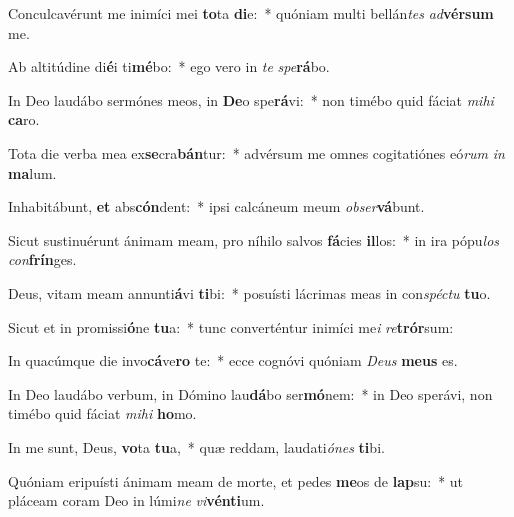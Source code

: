 \item Conculcavérunt me inimíci mei \textbf{to}ta \textbf{di}e:~* quóniam multi bellán\textit{tes} \textit{ad}\textbf{vér}\textbf{sum} me.
\item Ab altitúdine di\textbf{é}i ti\textbf{mé}bo:~* ego vero in \textit{te} \textit{spe}\textbf{rá}bo.
\item In Deo laudábo sermónes meos, in \textbf{De}o spe\textbf{rá}vi:~* non timébo quid fáciat \textit{mi}\textit{hi} \textbf{ca}ro.
\item Tota die verba mea ex\textbf{se}cra\textbf{bán}tur:~* advérsum me omnes cogitatiónes eó\textit{rum} \textit{in} \textbf{ma}lum.
\item Inhabitábunt, \textbf{et} abs\textbf{cón}dent:~* ipsi calcáneum meum \textit{ob}\textit{ser}\textbf{vá}bunt.
\item Sicut sustinuérunt ánimam meam, pro níhilo salvos \textbf{fá}cies \textbf{il}los:~* in ira pópu\textit{los} \textit{con}\textbf{frín}ges.
\item Deus, vitam meam annunti\textbf{á}vi \textbf{ti}bi:~* posuísti lácrimas meas in con\textit{spéc}\textit{tu} \textbf{tu}o.
\item Sicut et in promissi\textbf{ó}ne \textbf{tu}a:~* tunc converténtur inimíci me\textit{i} \textit{re}\textbf{trór}sum:
\item In quacúmque die invo\textbf{cá}ve\textbf{ro} te:~* ecce cognóvi quóniam \textit{De}\textit{us} \textbf{me}\textbf{us} es.
\item In Deo laudábo verbum, in Dómino lau\textbf{dá}bo ser\textbf{mó}nem:~* in Deo sperávi, non timébo quid fáciat \textit{mi}\textit{hi} \textbf{ho}mo.
\item In me sunt, Deus, \textbf{vo}ta \textbf{tu}a,~* quæ reddam, laudati\textit{ó}\textit{nes} \textbf{ti}bi.
\item Quóniam eripuísti ánimam meam de morte, et pedes \textbf{me}os de \textbf{lap}su:~* ut pláceam coram Deo in lúmi\textit{ne} \textit{vi}\textbf{vén}\textbf{ti}um.

